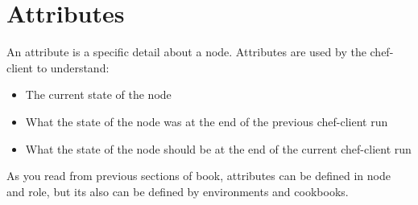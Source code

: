 \section{Attributes}

An attribute is a specific detail about a node. Attributes are used by the chef-client to understand:

\begin{itemize}
  \item The current state of the node
  \item What the state of the node was at the end of the previous chef-client run
  \item What the state of the node should be at the end of the current chef-client run
\end{itemize}

As you read from previous sections of book, attributes can be defined in node and role, but its also can be defined by environments and cookbooks.


